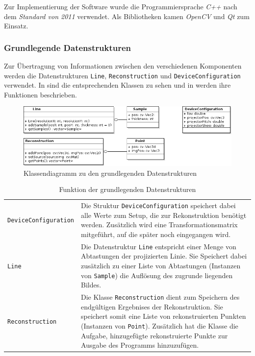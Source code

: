 \documentclass[ngerman,a4paper,parskip=half]{scrartcl}
\begin{document}
Zur Implementierung der Software wurde die Programmiersprache \emph{C++} nach dem \emph{Standard von 2011} verwendet. Als Bibliotheken kamen \emph{OpenCV} und \emph{Qt} zum Einsatz.

\subsubsection{Grundlegende Datenstrukturen}

Zur Übertragung von Informationen zwischen den verschiedenen Komponenten werden die Datenstrukturen \texttt{Line}, \texttt{Reconstruction} und \texttt{DeviceConfiguration} verwendet. In  sind die entsprechenden Klassen zu sehen und in  werden ihre Funktionen beschrieben.

\begin{figure}
	\centering
	\includegraphics[width=\linewidth]{includes/classdiagram_base.png}
	\caption{Klassendiagramm zu den grundlegenden Datenstrukturen}
	\label{fig:classes_base}
\end{figure}

\begin{table}
	\begin{tabular}{lp{10cm}}
		\texttt{DeviceConfiguration} &
			Die Struktur \texttt{DeviceConfiguration} speichert dabei alle Werte zum Setup, die zur Rekonstruktion benötigt werden. Zusätzlich wird eine Transformationsmatrix mitgeführt, auf die später noch eingegangen wird.\\[1em]
		\texttt{Line}                &
			Die Datenstruktur \texttt{Line} entspricht einer Menge von Abtastungen der projizierten Linie. Sie Speichert dabei zusätzlich zu einer Liste von Abtastungen (Instanzen von \texttt{Sample}) die Auflösung des zugrunde liegenden Bildes.\\[1em]
		\texttt{Reconstruction}      &
			Die Klasse \texttt{Reconstruction} dient zum Speichern des endgültigen Ergebnises der Rekonstruktion. Sie speichert somit eine Liste von rekonstruierten Punkten (Instanzen von \texttt{Point}). Zusätzlich hat die Klasse die Aufgabe, hinzugefügte rekonstruierte Punkte zur Ausgabe des Programms hinzuzufügen.
	\end{tabular}
	\caption{Funktion der grundlegenden Datenstrukturen}
	\label{tab:classes_base}
\end{table}
\end{document}
